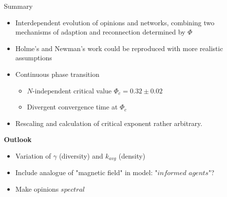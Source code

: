 \documentclass[xcolor=x11names,compress]{beamer}
\renewcommand{\(}{\begin{columns}}
\renewcommand{\)}{\end{columns}}
\newcommand{\<}[1]{\begin{column}{#1}}
\renewcommand{\>}{\end{column}}
\begin{document}
\begin{frame}{Summary}

\begin{itemize}
\item Interdependent evolution of opinions and networks, combining two mechanisms of adaption and reconnection determined by $\Phi$
\item Holme's and Newman's work could be reproduced with more realistic assumptions %
\item Continuous phase transition
\begin{itemize}
\item $N$-independent critical value $\Phi_c = 0.32 \pm 0.02$
\item Divergent convergence time at $\Phi_c$
\end{itemize}
\item Rescaling and calculation of critical exponent rather arbitrary.
\end{itemize}

\textbf{Outlook}
\begin{itemize}
\item Variation of $\gamma$ (diversity) and $k_{avg}$ (density)
\item Include analogue of "magnetic field" in model: "$informed$ $ agents$"?
\item Make opinions $spectral$
\end{itemize}

\end{frame}

\end{document}
